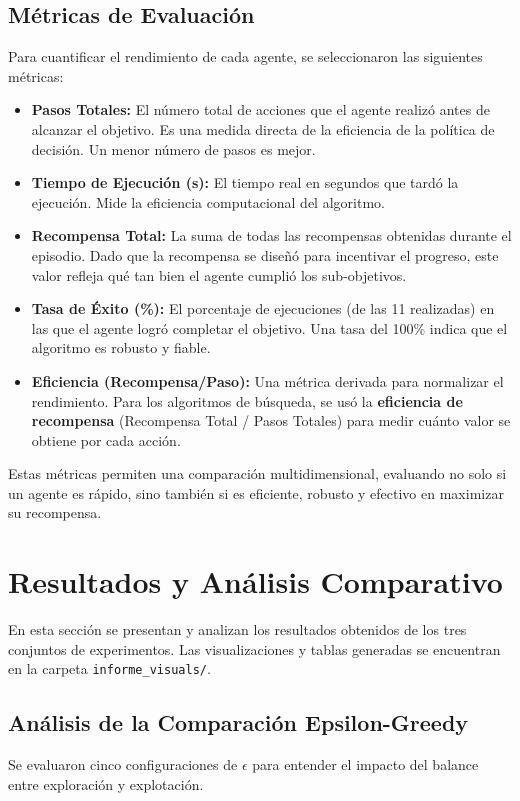 \documentclass[12pt, oneside, openany]{book}
\begin{document}
\subsection{Métricas de Evaluación}
Para cuantificar el rendimiento de cada agente, se seleccionaron las siguientes métricas:
\begin{itemize}
    \item \textbf{Pasos Totales:} El número total de acciones que el agente realizó antes de alcanzar el objetivo. Es una medida directa de la eficiencia de la política de decisión. Un menor número de pasos es mejor.
    \item \textbf{Tiempo de Ejecución (s):} El tiempo real en segundos que tardó la ejecución. Mide la eficiencia computacional del algoritmo.
    \item \textbf{Recompensa Total:} La suma de todas las recompensas obtenidas durante el episodio. Dado que la recompensa se diseñó para incentivar el progreso, este valor refleja qué tan bien el agente cumplió los sub-objetivos.
    \item \textbf{Tasa de Éxito (\%):} El porcentaje de ejecuciones (de las 11 realizadas) en las que el agente logró completar el objetivo. Una tasa del 100\% indica que el algoritmo es robusto y fiable.
    \item \textbf{Eficiencia (Recompensa/Paso):} Una métrica derivada para normalizar el rendimiento. Para los algoritmos de búsqueda, se usó la \textbf{eficiencia de recompensa} (Recompensa Total / Pasos Totales) para medir cuánto valor se obtiene por cada acción.
\end{itemize}

Estas métricas permiten una comparación multidimensional, evaluando no solo si un agente es rápido, sino también si es eficiente, robusto y efectivo en maximizar su recompensa.

\section{Resultados y Análisis Comparativo}
\label{sec:resultados}

En esta sección se presentan y analizan los resultados obtenidos de los tres conjuntos de experimentos. Las visualizaciones y tablas generadas se encuentran en la carpeta \texttt{informe\_visuals/}.

\subsection{Análisis de la Comparación Epsilon-Greedy}
Se evaluaron cinco configuraciones de $\epsilon$ para entender el impacto del balance entre exploración y explotación.
\end{document}
